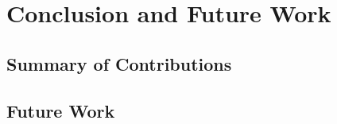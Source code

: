 \documentclass[../main.tex]{subfiles}
\begin{document}
\chapter{Conclusion and Future Work}
\label{ch:conclusion}


\section{Summary of Contributions}
\label{sec:conclusion-summary}

\section{Future Work}
\label{sec:conclusion-future-work}
\end{document}
